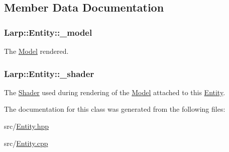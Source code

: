 \subsection{Member Data Documentation}
\subsubsection[{\texorpdfstring{\+\_\+model}{_model}}]{ Larp\+::\+Entity\+::\+\_\+model\hspace{0.3cm}{\ttfamily [private]}}\hypertarget{classLarp_1_1Entity_afdfe4aa2819f1ba5d0623cd034bec14e}{}\label{classLarp_1_1Entity_afdfe4aa2819f1ba5d0623cd034bec14e}
The \hyperlink{classLarp_1_1Model}{Model} rendered. 
\subsubsection[{\texorpdfstring{\+\_\+shader}{_shader}}]{ Larp\+::\+Entity\+::\+\_\+shader\hspace{0.3cm}{\ttfamily [private]}}\hypertarget{classLarp_1_1Entity_a237a03d104060dcf5db941d8b4bd5a5a}{}\label{classLarp_1_1Entity_a237a03d104060dcf5db941d8b4bd5a5a}
The \hyperlink{classLarp_1_1Shader}{Shader} used during rendering of the \hyperlink{classLarp_1_1Model}{Model} attached to this \hyperlink{classLarp_1_1Entity}{Entity}. 

The documentation for this class was generated from the following files\+:\begin{DoxyCompactItemize}
\item 
src/\hyperlink{Entity_8hpp}{Entity.\+hpp}\item 
src/\hyperlink{Entity_8cpp}{Entity.\+cpp}\end{DoxyCompactItemize}
